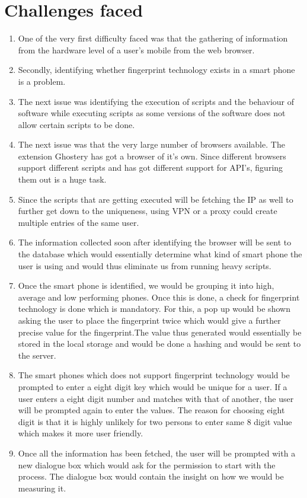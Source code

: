 \documentclass[journal]{IEEEtran}
\begin{document}
\section{Challenges faced}
\begin{enumerate}
\item One of the very first difficulty faced was that the gathering of information from the hardware level of a user's mobile from the web browser.  
\item Secondly, identifying whether fingerprint technology exists in a smart phone is a problem. 
\item The next issue was identifying the execution of scripts and the behaviour of software while executing scripts as some versions of the software does not allow certain scripts to be done. 
\item The next issue was that the very large number of browsers available. The extension Ghostery has got a browser of it's own. Since different browsers support different scripts and has got different support for API's, figuring them out is a huge task. 
\item Since the scripts that are getting executed will be fetching the IP as well to further get down to the uniqueness, using VPN or a proxy could create multiple entries of the same user. 
\item The information collected soon after identifying the browser will be sent to the database which would essentially determine what kind of smart phone the user is using and would thus eliminate us from running heavy scripts. 
\item Once the smart phone is identified, we would be grouping it into high, average and low performing phones. Once this is done, a check for fingerprint technology is done which is mandatory. For this, a pop up would be shown asking the user to place the fingerprint twice which would give a further precise value for the fingerprint.The value thus generated would essentially be stored in the local storage and would be done a hashing and would be sent to the server. 
\item The smart phones which does not support fingerprint technology would be prompted to enter a eight digit key which would be unique for a user. If a user enters a eight digit number and matches with that of another, the user will be prompted again to enter the values. The reason for choosing eight digit is that it is highly unlikely for two persons to enter same 8 digit value which makes it more user friendly. 
\item Once all the information has been fetched, the user will be prompted with a new dialogue box which would ask for the permission to start with the process. The dialogue box would contain the insight on how we would be measuring it.

\end{enumerate}
\end{document}
